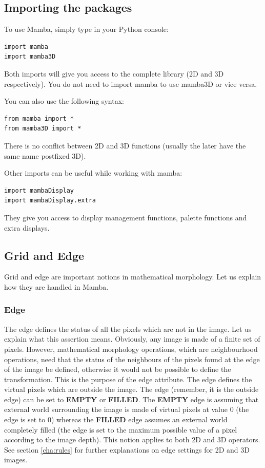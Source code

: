 \documentclass[a4paper,10pt,oneside]{article}
\begin{document}
\subsection{Importing the packages}

To use Mamba, simply type in your Python console:

\lstset{language=Python}
\begin{lstlisting}
import mamba
import mamba3D
\end{lstlisting}

Both imports will give you access to the complete library (2D and 3D respectively).
You do not need to import mamba to use mamba3D or vice versa.

You can also use the following syntax:

\lstset{language=Python}
\begin{lstlisting}
from mamba import *
from mamba3D import *
\end{lstlisting}

There is no conflict between 2D and 3D functions (usually the later have the
same name postfixed 3D).

Other imports can be useful while working with mamba:

\lstset{language=Python}
\begin{lstlisting}
import mambaDisplay
import mambaDisplay.extra
\end{lstlisting}

They give you access to display management functions, palette functions and
extra displays.

\subsection{Grid and Edge}

Grid and edge are important notions in mathematical morphology. Let us explain
how they are handled in Mamba. 

\subsubsection{Edge}
\label{cha:edge}

The edge defines the status of all the pixels which are not in the image. Let us 
explain what this assertion means. Obviously, any image is made of a finite set 
of pixels. However, mathematical morphology operations, which are neighbourhood 
operations, need that the status of the neighbours of the pixels found at 
the edge of the image be defined, otherwise it would not be possible to define the 
transformation. This is the purpose of the edge attribute. The edge defines the 
virtual pixels which are outside the image. The edge (remember, it is the outside 
edge) can be set to \textbf{EMPTY} or \textbf{FILLED}. The \textbf{EMPTY} edge
is assuming that external world surrounding 
the image is made of virtual pixels at value 0 (the edge is set to 0) whereas 
the \textbf{FILLED} edge assumes an external world completely filled 
(the edge is set to the maximum possible value of a pixel according to the image 
depth). This notion applies to both 2D and 3D operators. See section \ref{cha:rules} for
further explanations on edge settings for 2D and 3D images.
\end{document}
